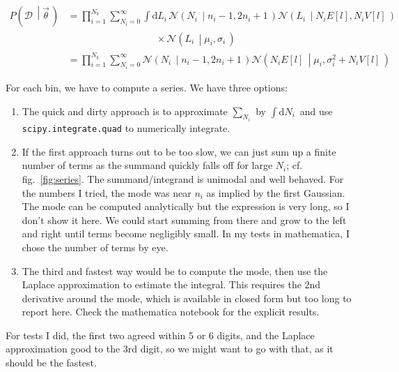 \documentclass[a4,12pt]{article}
\newcommand{\data}{\ensuremath{\mathcal{D}}}
\newcommand{\given}[2]{\left(#1\, \middle| #2 \, \right)}
\newcommand{\gaussian}{\ensuremath{\mathcal{N}}}
\newcommand{\Lumi}{\ensuremath{L_i}}
\newcommand{\rmdx}[1]{\mbox{d} #1 \,} %
\newcommand{\vecth}{\ensuremath{{\vec{\theta}}}}
\DeclareMathOperator{\erf}{erf}
\newcommand{\mui}{\mu_i}
\newcommand{\sigi}{\sigma_i^2}
\DeclareMathOperator{\sgn}{sgn}
\newcommand{\El}{E[l]}
\newcommand{\Vl}{V[l]}
\def \reffig#1{fig.~\ref{fig:#1}}
\begin{document}
\begin{align}
  \label{eq:all-large-n}
P\given{\data}{\vecth}  &=  \prod_{i=1}^{N_b} \sum_{N_i=0}^\infty \int \rmdx{\Lumi} \gaussian \given{N_i}{n_i-1, 2 n_i + 1} \gaussian \given{\Lumi}{N_i  E[l], N_i V[l]}\\
  & \phantom{\prod_{i=1}^{N_b} \sum_{N_i=0}^\infty \int \rmdx{\Lumi}} \times \gaussian \given{\Lumi}{\mu_i, \sigma_i} \nonumber\\
  & = \prod_{i=1}^{N_b} \sum_{N_i=0}^\infty \gaussian \given{N_i}{n_i-1, 2 n_i + 1} \gaussian \given{N_i \El}{\mu_i, \sigi + N_i \Vl}
\end{align}

For each bin, we have to compute a series. We have three options:
\begin{enumerate}
  \item The quick and dirty approach is to approximate $\sum_{N_i}$ by
  $\int \rmdx{N_i}$ and use \texttt{scipy.integrate.quad} to
  numerically integrate.
  \item If the first approach turns out to be too slow, we can just
  sum up a finite number of terms as the summand quickly falls off for
  large $N_i$; cf. \reffig{series}. The summand/integrand is unimodal
  and well behaved. For the numbers I tried, the mode was near $n_i$
  as implied by the first Gaussian. The mode can be computed
  analytically but the expression is very long, so I don't show it
  here. We could start summing from there and grow to the left and
  right until terms become negligibly small. In my tests in
  mathematica, I chose the number of terms by eye.
  \item The third and fastest way would be to compute the mode, then
  use the Laplace approximation to estimate the integral. This
  requires the 2nd derivative around the mode, which is available in
  closed form but too long to report here. Check the mathematica
  notebook for the explicit results.
\end{enumerate}
For tests I did, the first two agreed within 5 or 6 digits, and the
Laplace approximation good to the 3rd digit, so we might want to go
with that, as it should be the fastest.
\end{document}
